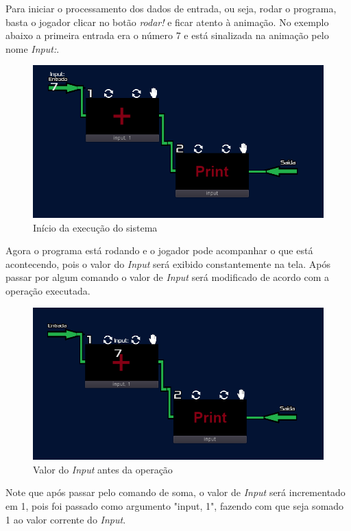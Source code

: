 Para iniciar o processamento dos dados de entrada, ou seja, rodar o programa,
basta o jogador clicar no botão \textit{rodar!} e ficar atento à animação.
No exemplo abaixo a primeira entrada era o número 7 e está sinalizada na 
animação pelo nome \textit{Input:}.

\begin{figure}[H]
    \includegraphics[width=\textwidth]{../figuras/inicio_da_execucao.png}
    \caption{Início da execu\c{c}\~{a}o do sistema}
\end{figure}

Agora o programa está rodando e o jogador pode acompanhar o que está 
acontecendo, pois o valor do \textit{Input} será exibido constantemente na tela.
Após passar por algum comando o valor de \textit{Input} será modificado de 
acordo com a operação executada.

\begin{figure}[H]
    \includegraphics[width=\textwidth]{../figuras/antes_da_soma.png}
    \caption{Valor do \textit{Input} antes da opera\c{c}\~{a}o}
\end{figure}

Note que após passar pelo comando de soma, o valor de \textit{Input} será 
incrementado em 1, pois foi passado como argumento "input, 1", fazendo com que 
seja somado 1 ao valor corrente do \textit{Input}.

